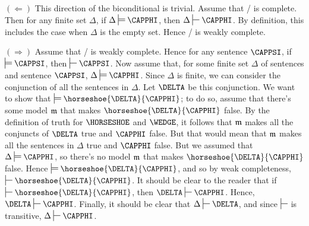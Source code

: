 \begin{PROOF}
	$(\Leftarrow)$ This direction of the biconditional is trivial. 
	Assume that \GSD{}/\GQD{} is complete. 
	Then for any finite set $\Delta$, if $\Delta\sdtstile{}{}\CAPPHI$, then $\Delta\sststile{}{}\CAPPHI$. 
	By definition, this includes the case when $\Delta$ is the empty set. 
	Hence \GSD{}/\GQD{} is weakly complete. 
	
	$(\Rightarrow)$ Assume that \GSD{}/\GQD{} is weakly complete. 
	Hence for any sentence $\CAPPSI$, if $\sdtstile{}{}\CAPPSI$, then $\sststile{}{}\CAPPSI$. 
	Now assume that, for some finite set $\Delta$ of sentences and sentence $\CAPPSI$, $\Delta\sdtstile{}{}\CAPPHI$.
	Since $\Delta$ is finite, we can consider the conjunction of all the sentences in $\Delta$.
	Let $\DELTA$ be this conjunction. 
	We want to show that $\sdtstile{}{}\horseshoe{\DELTA}{\CAPPHI}$;
	to do so, assume that there's some model $\mathfrak{m}$ that makes $\horseshoe{\DELTA}{\CAPPHI}$ false.
	By the definition of truth for $\HORSESHOE$ and $\WEDGE$, it follows that $\mathfrak{m}$ makes all the conjuncts of $\DELTA$ true and $\CAPPHI$ false. 
	But that would mean that $\mathfrak{m}$ makes all the sentences in $\Delta$ true and $\CAPPHI$ false.
	But we assumed that $\Delta\sdtstile{}{}\CAPPHI$, so there's no model $\mathfrak{m}$ that makes $\horseshoe{\DELTA}{\CAPPHI}$ false.
	Hence $\sdtstile{}{}\horseshoe{\DELTA}{\CAPPHI}$, and so by weak completeness, $\sststile{}{}\horseshoe{\DELTA}{\CAPPHI}$.
	It should be clear to the reader that if $\sststile{}{}\horseshoe{\DELTA}{\CAPPHI}$, then $\DELTA\sststile{}{}\CAPPHI$.
	Hence, $\DELTA\sststile{}{}\CAPPHI$.
	Finally, it should be clear that $\Delta\sststile{}{}\DELTA$, and since $\sststile{}{}$ is transitive, $\Delta\sststile{}{}\CAPPHI$.
\end{PROOF}
